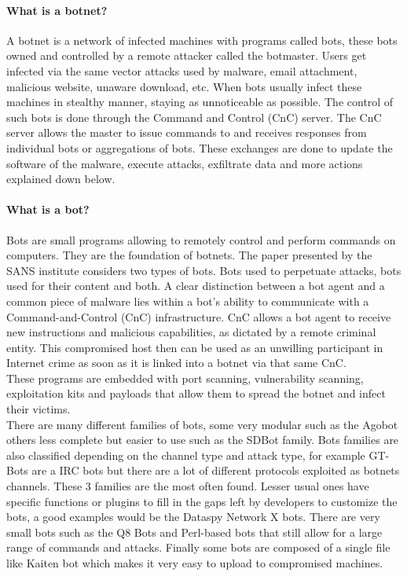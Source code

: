 \paragraph{What is a botnet?} A botnet is a network of infected machines with programs called bots, these bots owned and controlled by a remote attacker called the botmaster. Users get infected via the same vector attacks used by malware, email attachment, malicious website, unaware download, etc. When bots usually infect these machines in stealthy manner, staying as unnoticeable as possible. The control of such bots is done through the Command and Control (CnC) server. The CnC server allows the master to issue commands to and receives responses from individual bots or aggregations of bots. These exchanges are done to update the software of the malware, execute attacks, exfiltrate data and more actions explained down below.

\paragraph{What is a bot?} Bots are small programs allowing to remotely control and perform commands on computers. They are the foundation of botnets. The paper presented by the SANS institute considers two types of bots. Bots used to perpetuate attacks, bots used for their content and both. %
A clear distinction between a bot agent and a common piece of malware lies within a bot's ability to communicate with a Command-and-Control (CnC) infrastructure. CnC allows a bot agent to receive new instructions and malicious capabilities, as dictated by a remote criminal entity. This compromised host then can be used as an unwilling participant in Internet crime as soon as it is linked into a botnet via that same CnC.\\
These programs are embedded with port scanning, vulnerability scanning, exploitation kits and payloads that allow them to spread the botnet and infect their victims.\\
There are many different families of bots, some very modular such as the Agobot others less complete but easier to use such as the SDBot family. Bots families are also classified depending on the channel type and attack type, for example GT-Bots are a IRC bots but there are a lot of different protocols exploited as botnets channels. These 3 families are the most often found. Lesser usual ones have specific functions or plugins to fill in the gaps left by developers to customize the bots, a good examples would be the Dataspy Network X bots. There are very small bots such as the Q8 Bots and Perl-based bots that still allow for a large range of commands and attacks. Finally some bots are composed of a single file like Kaiten bot which makes it very easy to upload to compromised machines.

